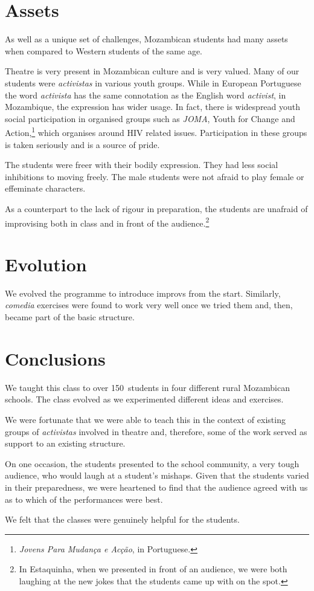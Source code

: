 \documentclass[article,twocolumn,twoside]{memoir}
\begin{document}
\chapter{Assets}
As well as a unique set of challenges, Mozambican students had many assets when
compared to Western students of the same age.

Theatre is very present in Mozambican culture and is very valued. Many of our
students were \textit{activistas} in various youth groups. While in European
Portuguese the word \textit{activista} has the same connotation as the English
word \textit{activist}, in Mozambique, the expression has wider usage. In fact,
there is widespread youth social participation in organised groups such as
\textit{JOMA}, Youth for Change and Action,\footnote{\textit{Jovens Para
Mudança e Acção}, in Portuguese.} which organises around HIV related issues.
Participation in these groups is taken seriously and is a source of pride.

The students were freer with their bodily expression. They had less social
inhibitions to moving freely.  The male students were not afraid to play female
or effeminate characters.

As a counterpart to the lack of rigour in preparation, the students are
unafraid of improvising both in class and in front of the audience.\footnote{In
Estaquinha, when we presented in front of an audience, we were both laughing at
the new jokes that the students came up with on the spot.} 

\chapter{Evolution}

We evolved the programme to introduce improvs from the start. Similarly,
\textsl{comedia} exercises were found to work very well once we tried them and,
then, became part of the basic structure.

\chapter{Conclusions}

We taught this class to over 150~students in four different rural Mozambican
schools. The class evolved as we experimented different ideas and exercises.

We were fortunate that we were able to teach this in the context of existing
groups of \textit{activistas} involved in theatre and, therefore, some of the
work served as support to an existing structure.

On one occasion, the students presented to the school community, a very tough
audience, who would laugh at a student's mishaps. Given that the students
varied in their preparedness, we were heartened to find that the audience
agreed with us as to which of the performances were best.

We felt that the classes were genuinely helpful for the students.
\end{document}
